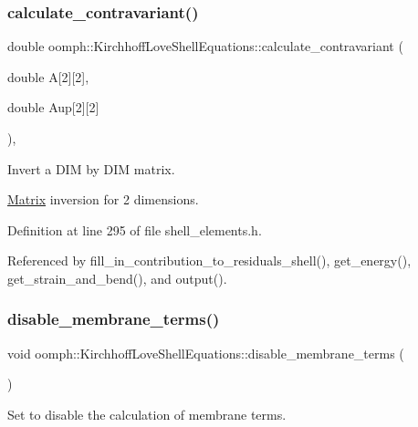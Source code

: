 \subsubsection{\texorpdfstring{calculate\+\_\+contravariant()}{calculate\_contravariant()}}
{\footnotesize\ttfamily double oomph\+::\+Kirchhoff\+Love\+Shell\+Equations\+::calculate\+\_\+contravariant (\begin{DoxyParamCaption}\item[{double}]{A\mbox{[}2\mbox{]}\mbox{[}2\mbox{]},  }\item[{double}]{Aup\mbox{[}2\mbox{]}\mbox{[}2\mbox{]} }\end{DoxyParamCaption})\hspace{0.3cm}{\ttfamily [inline]}, {\ttfamily [protected]}}



Invert a D\+IM by D\+IM matrix. 

\hyperlink{classoomph_1_1Matrix}{Matrix} inversion for 2 dimensions. 

Definition at line 295 of file shell\+\_\+elements.\+h.



Referenced by fill\+\_\+in\+\_\+contribution\+\_\+to\+\_\+residuals\+\_\+shell(), get\+\_\+energy(), get\+\_\+strain\+\_\+and\+\_\+bend(), and output().

\mbox{\label{classoomph_1_1KirchhoffLoveShellEquations_ae4a6f1de19bfed4958d9975a57e66438}} 
\subsubsection{\texorpdfstring{disable\+\_\+membrane\+\_\+terms()}{disable\_membrane\_terms()}}
{\footnotesize\ttfamily void oomph\+::\+Kirchhoff\+Love\+Shell\+Equations\+::disable\+\_\+membrane\+\_\+terms (\begin{DoxyParamCaption}{ }\end{DoxyParamCaption})\hspace{0.3cm}{\ttfamily [inline]}}



Set to disable the calculation of membrane terms. 



